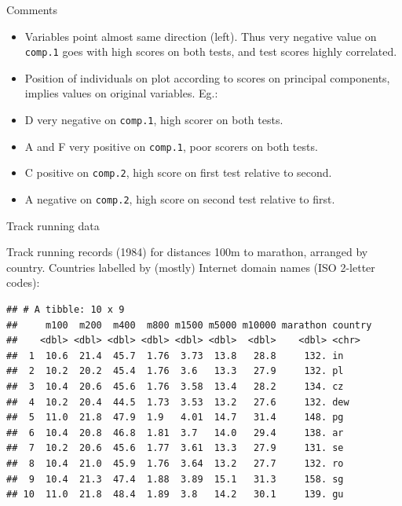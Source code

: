 \documentclass[ignorenonframetext,]{beamer}
\newenvironment{Shaded}{\begin{snugshade}}{\end{snugshade}}
\newcommand{\DecValTok}[1]{\textcolor[rgb]{0.00,0.00,0.81}{#1}}
\newcommand{\KeywordTok}[1]{\textcolor[rgb]{0.13,0.29,0.53}{\textbf{#1}}}
\newcommand{\NormalTok}[1]{#1}
\newcommand{\OperatorTok}[1]{\textcolor[rgb]{0.81,0.36,0.00}{\textbf{#1}}}
\newcommand{\StringTok}[1]{\textcolor[rgb]{0.31,0.60,0.02}{#1}}
\begin{document}
\begin{frame}[fragile]{Comments}
\protect\hypertarget{comments-33}{}

\begin{itemize}
\item
  Variables point almost same direction (left). Thus very negative value
  on \texttt{comp.1} goes with high scores on both tests, and test
  scores highly correlated.
\item
  Position of individuals on plot according to scores on principal
  components, implies values on original variables. Eg.:
\item
  D very negative on \texttt{comp.1}, high scorer on both tests.
\item
  A and F very positive on \texttt{comp.1}, poor scorers on both tests.
\item
  C positive on \texttt{comp.2}, high score on first test relative to
  second.
\item
  A negative on \texttt{comp.2}, high score on second test relative to
  first.
\end{itemize}

\end{frame}

\begin{frame}[fragile]{Track running data}
\protect\hypertarget{track-running-data}{}

Track running records (1984) for distances 100m to marathon, arranged by
country. Countries labelled by (mostly) Internet domain names (ISO
2-letter codes):

\scriptsize

\begin{Shaded}
\end{Shaded}

\begin{verbatim}
## # A tibble: 10 x 9
##     m100  m200  m400  m800 m1500 m5000 m10000 marathon country
##    <dbl> <dbl> <dbl> <dbl> <dbl> <dbl>  <dbl>    <dbl> <chr>  
##  1  10.6  21.4  45.7  1.76  3.73  13.8   28.8     132. in     
##  2  10.2  20.2  45.4  1.76  3.6   13.3   27.9     132. pl     
##  3  10.4  20.6  45.6  1.76  3.58  13.4   28.2     134. cz     
##  4  10.2  20.4  44.5  1.73  3.53  13.2   27.6     132. dew    
##  5  11.0  21.8  47.9  1.9   4.01  14.7   31.4     148. pg     
##  6  10.4  20.8  46.8  1.81  3.7   14.0   29.4     138. ar     
##  7  10.2  20.6  45.6  1.77  3.61  13.3   27.9     131. se     
##  8  10.4  21.0  45.9  1.76  3.64  13.2   27.7     132. ro     
##  9  10.4  21.3  47.4  1.88  3.89  15.1   31.3     158. sg     
## 10  11.0  21.8  48.4  1.89  3.8   14.2   30.1     139. gu
\end{verbatim}

\normalsize

\end{frame}
\end{document}
